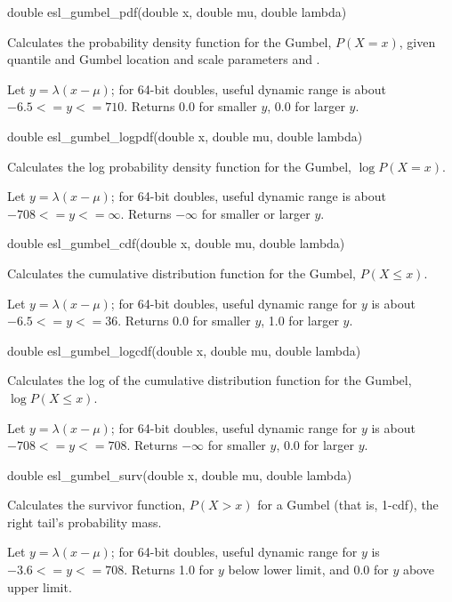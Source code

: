\begin{sreapi}
\hypertarget{func:esl_gumbel_pdf()}
{\item[double esl\_gumbel\_pdf(double x, double mu, double lambda)]}

Calculates the probability density function for the Gumbel,
$P(X=x)$, given quantile  and Gumbel location and
scale parameters  and .

Let $y = \lambda(x-\mu)$; for 64-bit doubles,
useful dynamic range is about $-6.5 <= y <= 710$.
Returns 0.0 for smaller $y$, 0.0 for larger $y$.


\hypertarget{func:esl_gumbel_logpdf()}
{\item[double esl\_gumbel\_logpdf(double x, double mu, double lambda)]}

Calculates the log probability density function for the Gumbel,
$\log P(X=x)$.

Let $y = \lambda(x-\mu)$; for 64-bit doubles,
useful dynamic range is about $-708 <= y <= \infty$.
Returns $-\infty$ for smaller or larger $y$.


\hypertarget{func:esl_gumbel_cdf()}
{\item[double esl\_gumbel\_cdf(double x, double mu, double lambda)]}

Calculates the cumulative distribution function
for the Gumbel, $P(X \leq x)$.

Let $y = \lambda(x-\mu)$; for 64-bit doubles,
useful dynamic range for $y$ is about $-6.5 <= y <=36$.
Returns 0.0 for smaller $y$, 1.0 for larger $y$.


\hypertarget{func:esl_gumbel_logcdf()}
{\item[double esl\_gumbel\_logcdf(double x, double mu, double lambda)]}

Calculates the log of the cumulative distribution function
for the Gumbel, $\log P(X \leq x)$.

Let $y = \lambda(x-\mu)$; for 64-bit doubles,
useful dynamic range for $y$ is about $-708 <= y <= 708$.
Returns $-\infty$ for smaller $y$, 0.0 for larger $y$.


\hypertarget{func:esl_gumbel_surv()}
{\item[double esl\_gumbel\_surv(double x, double mu, double lambda)]}

Calculates the survivor function, $P(X>x)$ for a Gumbel 
(that is, 1-cdf), the right tail's probability mass.

Let $y=\lambda(x-\mu)$; for 64-bit doubles, 
useful dynamic range for $y$ is $-3.6 <= y <= 708$.
Returns 1.0 for $y$ below lower limit, and 0.0
for $y$ above upper limit.



\end{sreapi}
